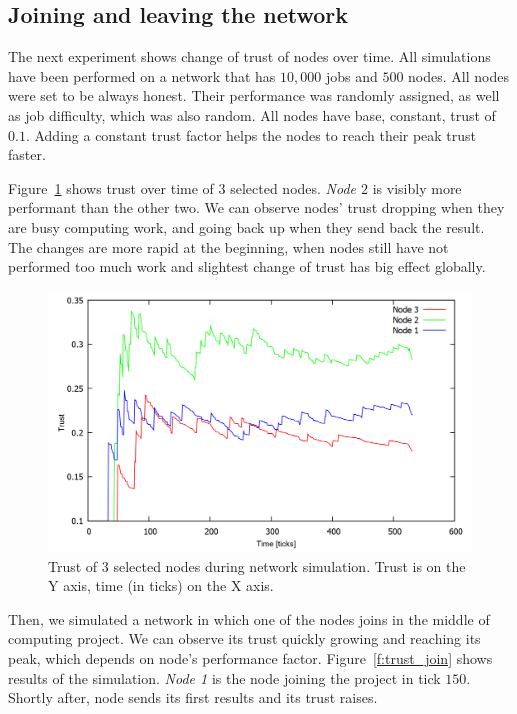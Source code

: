 \FloatBarrier

\subsection{Joining and leaving the network}

The next experiment shows change of trust of nodes over time. All simulations have been performed on a network that has $10,000$ jobs and $500$ nodes. All nodes were set to be always honest. Their performance was randomly assigned, as well as job difficulty, which was also random. All nodes have base, constant, trust of $0.1$. Adding a constant trust factor helps the nodes to reach their peak trust faster.

Figure~\ref{f:trust1} shows trust over time of $3$ selected nodes. \emph{Node $2$} is visibly more performant than the other two. We can observe nodes' trust dropping when they are busy computing work, and going back up when they send back the result. The changes are more rapid at the beginning, when nodes still have not performed too much work and slightest change of trust has big effect globally. 

\begin{figure}
\centering
\includegraphics[width=\textwidth]{diagrams/trust1.png}
\caption{Trust of 3 selected nodes during network simulation. Trust is on the Y axis, time (in ticks) on the X axis.}
\label{f:trust1}
\end{figure}

Then, we simulated a network in which one of the nodes joins in the middle of computing project. We can observe its trust quickly growing and reaching its peak, which depends on node's performance factor. Figure~\ref{f:trust_join} shows results of the simulation. \emph{Node 1} is the node joining the project in tick $150$. Shortly after, node sends its first results and its trust raises.

